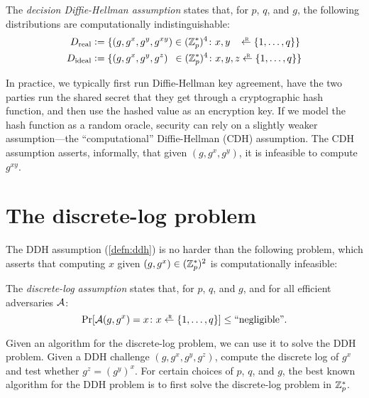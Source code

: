 \begin{definition}\label{defn:ddh}
The \emph{decision Diffie-Hellman assumption} states that,
for $p$, $q$, and $g$, the following distributions are 
computationally indistinguishable:
  \begin{align*}
    D_\text{real} &\deq \{ (g, g^x, g^y, g^{xy}) \in (\Z^*_p)^4\colon x, y \,\,\,\,\,\getsr \{1, \dots, q\}\}\\
    D_\text{ideal} &\deq \{ (g, g^x, g^y, g^z) \,\,\,\in (\Z^*_p)^4 \colon x, y, z \getsr \{1, \dots, q\}\}
  \end{align*}
\end{definition}

In practice, we typically first run Diffie-Hellman key
agreement, have the two parties run the
shared secret that they get through a cryptographic hash function, 
and then use the hashed value as an encryption key.
If we model the hash function as a random oracle, security can rely
on a slightly weaker assumption---the ``computational'' Diffie-Hellman
(CDH) assumption.
The CDH assumption asserts, informally, that given $(g, g^x, g^y)$, it is
infeasible to compute $g^{xy}$.


\section{The discrete-log problem}
The DDH assumption (\cref{defn:ddh}) is no harder than the following
problem, which asserts that computing $x$ given $(g, g^x) \in (\mathbb{Z}_p^*)^2$
is computationally infeasible:
\begin{definition}
The \emph{discrete-log assumption} states that,
for $p$, $q$, and $g$, and for all efficient 
adversaries $\mathcal{A}$:
  \[ \Pr[\calA(g, g^x) = x \colon x \getsr \{1, \dots, q\} ] \leq \text{``negligible''}.\]
\end{definition}
Given an algorithm for the discrete-log problem, we can use it to solve the DDH problem.
Given a DDH challenge $(g, g^x, g^y, g^{z})$, compute the discrete log of $g^x$ and
test whether $g^z = {(g^y)}^x$.
For certain choices of $p$, $q$, and $g$, the best known algorithm for the DDH problem
is to first solve the discrete-log problem in $\mathbb{Z}^*_p$.

